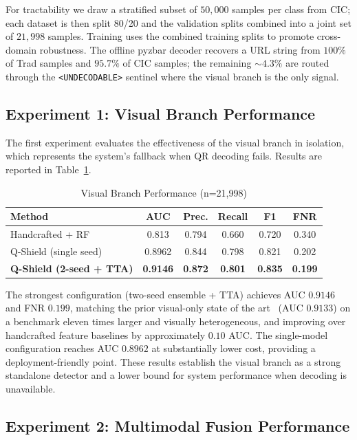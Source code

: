 \documentclass[conference]{IEEEtran}
\begin{document}
For tractability we draw a stratified subset of $50{,}000$ samples per class from CIC; each dataset is then split 80/20 and the validation splits combined into a joint set of $21{,}998$ samples. Training uses the combined training splits to promote cross-domain robustness. The offline pyzbar decoder recovers a URL string from $100\%$ of Trad samples and $95.7\%$ of CIC samples; the remaining $\sim$$4.3\%$ are routed through the \texttt{<UNDECODABLE>} sentinel where the visual branch is the only signal.

\subsection{Experiment 1: Visual Branch Performance}

The first experiment evaluates the effectiveness of the visual branch in isolation, which represents the system's fallback when QR decoding fails. Results are reported in Table~\ref{tab:visual}.

\begin{table}[htp]
\caption{Visual Branch Performance (n=21,998)}
\label{tab:visual}
\centering
\small
\begin{tabular}{lccccc}
\toprule
\textbf{Method} & \textbf{AUC} & \textbf{Prec.} & \textbf{Recall} & \textbf{F1} & \textbf{FNR} \\
\midrule
Handcrafted + RF & 0.813 & 0.794 & 0.660 & 0.720 & 0.340 \\
Q-Shield (single seed) & 0.8962 & 0.844 & 0.798 & 0.821 & 0.202 \\
\textbf{Q-Shield (2-seed + TTA)} & \textbf{0.9146} & \textbf{0.872} & \textbf{0.801} & \textbf{0.835} & \textbf{0.199} \\
\bottomrule
\end{tabular}
\end{table}

The strongest configuration (two-seed ensemble + TTA) achieves AUC $0.9146$ and FNR $0.199$, matching the prior visual-only state of the art~\cite{trad2025detecting} (AUC $0.9133$) on a benchmark eleven times larger and visually heterogeneous, and improving over handcrafted feature baselines by approximately $0.10$ AUC. The single-model configuration reaches AUC $0.8962$ at substantially lower cost, providing a deployment-friendly point. These results establish the visual branch as a strong standalone detector and a lower bound for system performance when decoding is unavailable.

\subsection{Experiment 2: Multimodal Fusion Performance}
\end{document}
